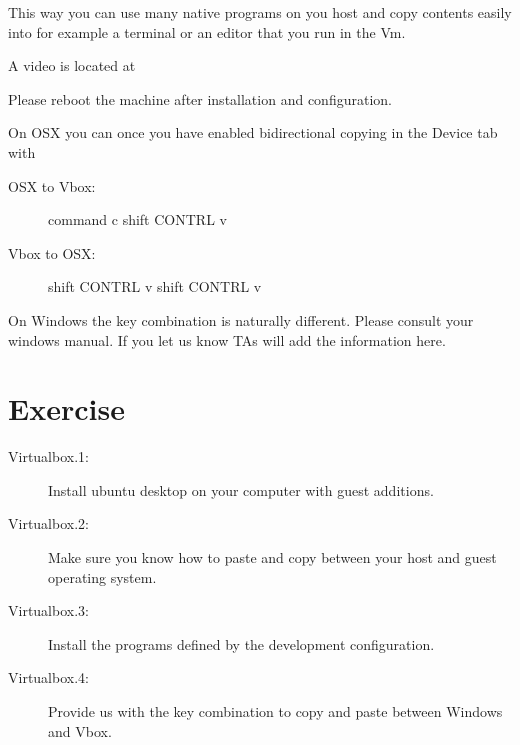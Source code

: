 This way you can use many native programs on you host and copy contents
easily into for example a terminal or an editor that you run in the Vm.

A video is located at



Please reboot the machine after installation and configuration.

On OSX you can once you have enabled bidirectional copying in the Device
tab with

\begin{description}
\item[OSX to Vbox:] command c shift CONTRL v
\item[Vbox to OSX:] shift CONTRL v shift CONTRL v
\end{description}

\begin{NOTE}
  On Windows the key combination is naturally different. Please
  consult your windows manual. If you let us know TAs will add the
  information here.
\end{NOTE}




\section{Exercise}

\begin{description}
\item[Virtualbox.1:] Install ubuntu desktop on your computer with
  guest additions.
\item[Virtualbox.2:] Make sure you know how to paste and copy between
  your host and guest operating system.
\item[Virtualbox.3:] Install the programs defined by the development
  configuration.
\item[Virtualbox.4:] Provide us with the key combination to copy and
  paste between Windows and Vbox.
\end{description}

